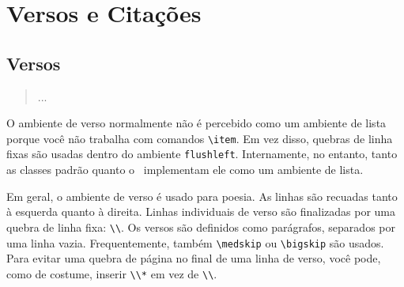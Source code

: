 \chapter{Versos e Citações}
\section{Versos}
\begin{Large}
\begin{verbnobox}[\hspace{1in}]
     \begin{verse}...\end{verse}  
\end{verbnobox}
\end{Large}


O ambiente de verso normalmente não é percebido como um ambiente de lista porque você não trabalha com comandos \verb|\item|. Em vez disso, quebras de linha fixas são usadas dentro do ambiente \texttt{flushleft}. Internamente, no entanto, tanto as classes padrão quanto o \KOMAScript\ implementam ele como um ambiente de lista.

Em geral, o ambiente de verso é usado para poesia. As linhas são recuadas tanto à esquerda quanto à direita. Linhas individuais de verso são finalizadas por uma quebra de linha fixa: \verb|\\|. Os versos são definidos como parágrafos, separados por uma linha vazia. Frequentemente, também \verb|\medskip| ou \verb|\bigskip| são usados. Para evitar uma quebra de página no final de uma linha de verso, você pode, como de costume, inserir \verb|\\*| em vez de \verb|\\|.

